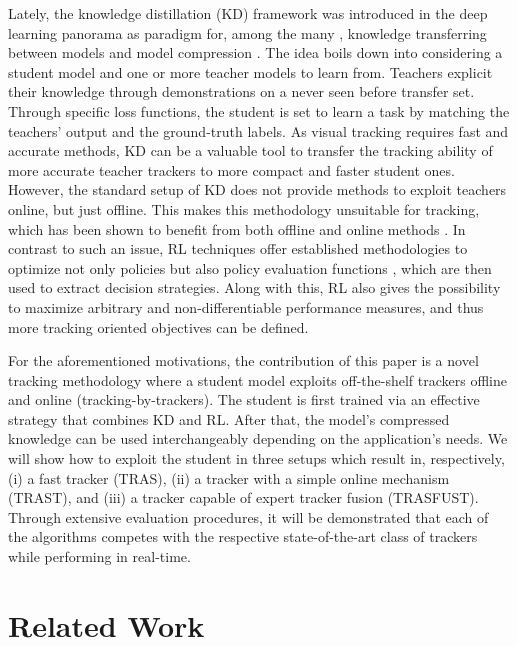 \documentclass[runningheads]{llncs}
\makeatletter
\def\myalgonamefirst{TRAS\@\xspace}
\def\myalgonamesecond{TRAST\@\xspace}
\def\myalgonamethird{TRASFUST\@\xspace}
\makeatother
\begin{document}
Lately, the knowledge distillation (KD) framework \cite{Hinton2014KD} was introduced in the deep learning panorama as paradigm for, among the many \cite{He2016ResNet,Tang2016,Li2017KDnoise,Phuong2019}, knowledge transferring between models \cite{Geras2015} and model compression \cite{Chen2017,Howard2017,Polino2018}.
The idea boils down into considering a student model and one or more teacher models to learn from. Teachers explicit their knowledge through demonstrations on a never seen before transfer set. Through specific loss functions, the student is set to learn a task by matching the teachers' output and the ground-truth labels.
As visual tracking requires fast and accurate methods, KD can be a valuable tool to transfer the tracking ability of more accurate teacher trackers to more compact and faster student ones.
However, the standard setup of KD does not provide methods to exploit teachers online, but just offline. 
This makes this methodology unsuitable for tracking, which has been shown to benefit from both offline and online methods \cite{ATOM,DiMP,ECO,Yun2017,Chen2018}.
In contrast to such an issue, RL techniques offer established methodologies to optimize not only policies but also policy evaluation functions \cite{Watkins1992,Konda2000,Sutton2000,Mnih2013,Mnih2016}, which are then used to extract decision strategies. Along with this, RL also gives the possibility to maximize arbitrary and non-differentiable performance measures, and thus more tracking oriented objectives can be defined.


For the aforementioned motivations, the contribution of this paper is a novel tracking methodology where a student model exploits off-the-shelf trackers offline and online (tracking-by-trackers). The student is first trained via an effective strategy that combines KD and RL. After that, the model's compressed knowledge can be used interchangeably depending on the application's needs.
We will show how to exploit the student in three setups which result in, respectively, (i) a fast tracker (\myalgonamefirst), (ii) a tracker with a simple online mechanism (\myalgonamesecond), and (iii) a tracker capable of expert tracker fusion (\myalgonamethird). 
Through extensive evaluation procedures, it will be demonstrated that each of the algorithms competes with the respective state-of-the-art class of trackers while performing in real-time.
 
\section{Related Work}
\end{document}
